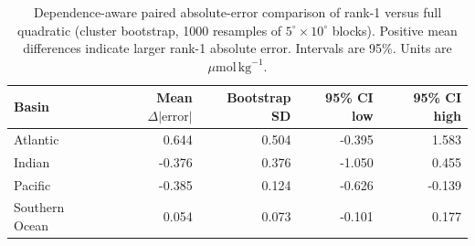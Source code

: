 \begin{table}[htbp]
\centering
\caption{Dependence-aware paired absolute-error comparison of rank-1 versus full quadratic (cluster bootstrap, 1000 resamples of $5^\circ\times 10^\circ$ blocks). Positive mean differences indicate larger rank-1 absolute error. Intervals are 95\%. Units are $\mu\mathrm{mol}\,\mathrm{kg}^{-1}$.}
\label{tab:equivalence}
\begin{tabular}{lrrrr}
\toprule
Basin & Mean $\Delta|\mathrm{error}|$ & Bootstrap SD & 95\% CI low & 95\% CI high \\
\midrule
Atlantic & 0.644 & 0.504 & -0.395 & 1.583 \\
Indian & -0.376 & 0.376 & -1.050 & 0.455 \\
Pacific & -0.385 & 0.124 & -0.626 & -0.139 \\
Southern Ocean & 0.054 & 0.073 & -0.101 & 0.177 \\
\bottomrule
\end{tabular}
\end{table}
